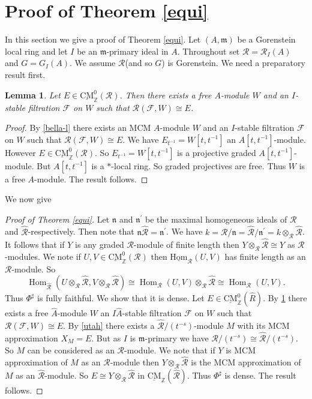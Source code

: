 \documentclass{amsart}
\newcommand{\n}{\mathfrak{n} }
\newcommand{\m}{\mathfrak{m} }
\newcommand{\Z}{\mathbb{Z} }
\newcommand{\eR}{\mathcal{R} }
\newcommand{\Fc}{\mathcal{F} }
\newcommand{\wh}{\widehat }
\newcommand{\CMS}{\operatorname{\underline{CM}}}
\newcommand{\Hom}{\operatorname{Hom}}
\newcommand{\sHom}{\operatorname{\underline{Hom}}}
\theoremstyle{plain}
\newtheorem{lemma}[theorem]{Lemma}
\theoremstyle{definition}
\theoremstyle{remark}
\begin{document}
{\section{Proof of Theorem \ref{equi}}
In this section we give a proof of Theorem \ref{equi}. Let $(A,\m)$ be a Gorenstein local ring and let $I$ be an  $\m$-primary ideal in $A$.
Throughout  set  $\eR = \eR_I(A)$ and $G = G_I(A)$. We assume $\eR$(and so $G$) is Gorenstein. We need a preparatory result first.
\begin{lemma}\label{rain}
Let $E \in \CMS^0_\Z(\eR)$.
Then there exists a free $A$-module $W$ and an $I$-stable filtration $\Fc$ on $W$ such that $\eR(\Fc, W) \cong  E$.
\end{lemma}
\begin{proof}
By \ref{bella-l}
  there exists an MCM $A$-module $W$ and an $I$-stable filtration $\Fc$ on $W$ such that $\eR(\Fc, W) \cong  E$. We have $E_{t^{-1}} = W[t,t^{-1}]$ an $A[t,t^{-1}]$-module. However $E \in \CMS^0_\Z(\eR)$. So $E_{t^{-1}} = W[t,t^{-1}]$ is a projective graded $A[t,t^{-1}]$-module. But $A[t,t^{-1}]$ is a $*$-local ring. So graded projectives are free. Thus $W$ is a free $A$-module. The result follows.
\end{proof}
We now give
\begin{proof}[Proof of Theorem \ref{equi}]
Let $\n$ and $\n^\prime$ be the maximal homogeneous  ideals of $\eR$ and $\wh{\eR}$-respectively. Then note that $\n \wh{\eR} = \n^\prime$. We have $k = \eR/\n = \wh{\eR}/\n^\prime = k \otimes_{\eR}\wh{\eR}$. It follows that if $Y$ is any graded $\eR$-module of finite length then $Y\otimes_{\eR}\wh{\eR} \cong Y$ as $\eR$-modules.
We note if $U, V \in \CMS_\Z^0(\eR)$ then $\sHom_{\eR}(U, V)$ has finite length as an $\eR$-module. So
$$\Hom_{\wh{\eR}}(U\otimes_{\eR}\wh{\eR}, V\otimes_{\eR}\wh{\eR}) \cong \Hom_{\eR}(U, V) \otimes_{\eR} \wh{\eR} \cong \Hom_{\eR}(U, V).$$
Thus $\Phi^\sharp $ is fully faithful.
We show that it is dense.
Let $E \in \CMS^0_\Z(\wh{R})$. By \ref{rain} there exists a free $\wh{A}$-module $W$ an $I\wh{A}$-stable filtration $\Fc$ on $W$ such that $\eR(\Fc, W) \cong  E$. By \ref{utah} there exists a $\wh{\eR}/(t^{-s})$-module $M$ with its MCM approximation $X_M = E$. But as $I$ is $\m$-primary we have $\eR/(t^{-s}) \cong \wh{\eR}/(t^{-s})$. So $M$ can be considered as an $\eR$-module. We note that if $Y$ is MCM approximation of $M$ as an $\eR$-module then $Y\otimes_\eR\wh{\eR}$ is the MCM approximation of $M$ as an $\wh{\eR}$-module. So $E \cong Y\otimes_\eR\wh{\eR}$ in $\CMS_\Z(\wh{\eR})$. Thus $\Phi^\sharp $ is dense. The result follows.
\end{proof}
}
\end{document}
